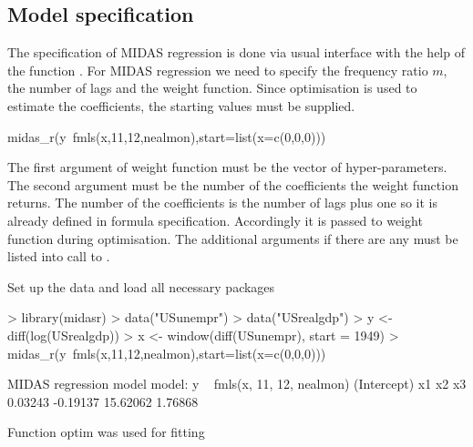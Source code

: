 \documentclass[nojss]{jss}
\begin{document}
\subsection{Model specification}

The specification of MIDAS regression is done via usual 
interface with the help of the function . For MIDAS
regression we need to specify the frequency ratio $m$, the number of
lags and the weight function. Since optimisation is used to estimate
the coefficients, the starting values must be supplied. 

\begin{Code}
midas_r(y~fmls(x,11,12,nealmon),start=list(x=c(0,0,0)))  
\end{Code}

The first argument of weight function must be the vector of
hyper-parameters. The second argument must be the number of the
coefficients the weight function returns. The number of the
coefficients is the number of lags plus one  so it is already defined
in formula specification. Accordingly it is passed to weight function
during optimisation. The additional arguments if there are any must be
listed into call to .

Set up the data and load all necessary packages
\begin{Schunk}
\begin{Sinput}
> library(midasr)
> data("USunempr")
> data("USrealgdp")
> y <- diff(log(USrealgdp))
> x <- window(diff(USunempr), start = 1949)
> midas_r(y~fmls(x,11,12,nealmon),start=list(x=c(0,0,0)))
\end{Sinput}
\begin{Soutput}
MIDAS regression model
 model: y ~ fmls(x, 11, 12, nealmon) 
(Intercept)          x1          x2          x3 
    0.03243    -0.19137    15.62062     1.76868 

Function optim was used for fitting
\end{Soutput}
\end{Schunk}


\end{document}
